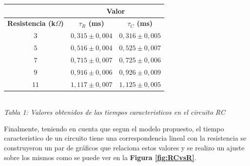 \documentclass[11pt,a4paper]{article}
\begin{document}
\begin{center}
\begin{tabular}{||c|c|c||}
\hline
& \multicolumn{2}{c||}{\textbf{Valor}} \\ \hline
\textbf{Resistencia (k$\Omega$)} & \textbf{$\tau_{R}$ (ms)} & \textbf{$\tau_{C}$ (ms)} \\ \hline 
$3$ & $0,315 \pm 0,004$ & $0,316 \pm 0,005$ \\ \hline 
$5$ & $0,516\pm 0,004$ & $0,525 \pm 0,007$ \\ \hline 
$7$ & $0,715\pm 0,007$ & $0,725\pm 0,006$ \\ \hline 
$9$ & $0,916 \pm 0,006$ & $0,926 \pm 0,009$ \\ \hline 
$11$ & $1,117\pm 0,007$ & $1,125\pm 0,005$ \\ \hline 
\end{tabular}\\[0.3cm]
 
\textit{Tabla 1: Valores obtenidos de las tiempos caracteristicos en el circuito RC}
\end{center}

Finalmente, teniendo en cuenta que segun el modelo propuesto, el tiempo caracteristico de un circuito tiene una correspondencia lineal con la resistencia se construyeron un par de gráficos que relaciona estos valores y se realizo un ajuste sobre los mismos como se puede ver en la \textbf{Figura \ref{fig:RCvsR}}.
\end{document}
